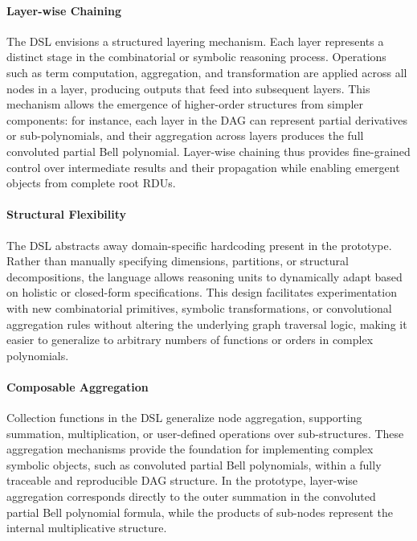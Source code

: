 \documentclass[11pt]{article}
\begin{document}
\paragraph{Layer-wise Chaining} The DSL envisions a structured layering mechanism. Each layer represents a distinct stage in the combinatorial or symbolic reasoning process. Operations such as term computation, aggregation, and transformation are applied across all nodes in a layer, producing outputs that feed into subsequent layers. This mechanism allows the emergence of higher-order structures from simpler components: for instance, each layer in the DAG can represent partial derivatives or sub-polynomials, and their aggregation across layers produces the full convoluted partial Bell polynomial. Layer-wise chaining thus provides fine-grained control over intermediate results and their propagation while enabling emergent objects from complete root RDUs.

\paragraph{Structural Flexibility} The DSL abstracts away domain-specific hardcoding present in the prototype. Rather than manually specifying dimensions, partitions, or structural decompositions, the language allows reasoning units to dynamically adapt based on holistic or closed-form specifications. This design facilitates experimentation with new combinatorial primitives, symbolic transformations, or convolutional aggregation rules without altering the underlying graph traversal logic, making it easier to generalize to arbitrary numbers of functions or orders in complex polynomials.

\paragraph{Composable Aggregation} Collection functions in the DSL generalize node aggregation, supporting summation, multiplication, or user-defined operations over sub-structures. These aggregation mechanisms provide the foundation for implementing complex symbolic objects, such as convoluted partial Bell polynomials, within a fully traceable and reproducible DAG structure. In the prototype, layer-wise aggregation corresponds directly to the outer summation in the convoluted partial Bell polynomial formula, while the products of sub-nodes represent the internal multiplicative structure.
\end{document}
